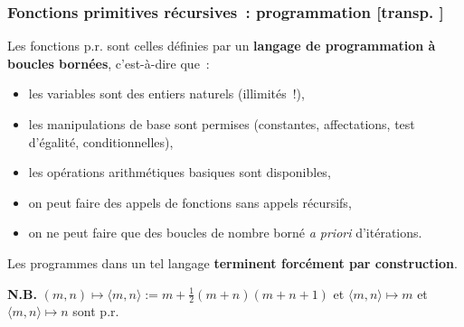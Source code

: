 \documentclass[mathserif,a4paper,aspectratio=169]{beamer}
\newcommand{\itempoint}{\strut\hbox{\color{beamerstructure}\donotcoloroutermaths$\blacktriangleright$}\nobreak\hskip.5em plus.5em\relax}
\newcommand{\donotcoloroutermaths}{\relax}
\renewcommand{\frametitle}[1]{\subsubsection*{#1 {\footnotesize[transp. \insertframenumber]}}}
\newcommand{\myitemmark}{\hbox{$\blacktriangleright$}}
\renewcommand{\itempoint}{\strut\myitemmark\nobreak\hskip.5em plus.5em\relax}
\begin{document}
%
\begin{frame}
\frametitle{Fonctions primitives récursives : programmation}

Les fonctions p.r. sont celles définies par un \textbf{langage de
  programmation à boucles bornées}, c'est-à-dire que :
\begin{itemize}
\item les variables sont des entiers naturels (illimités !),
\item les manipulations de base sont permises (constantes,
  affectations, test d'égalité, conditionnelles),
\item les opérations arithmétiques basiques sont disponibles,
\item on peut faire des appels de fonctions \alert{sans appels récursifs},
\item on ne peut faire que des boucles \alert{de nombre borné
  \textit{a priori}} d'itérations.
\end{itemize}

\medskip

Les programmes dans un tel langage \textbf{terminent forcément par
  construction}.

\bigskip

\textbf{N.B.} $(m,n) \mapsto \langle m,n\rangle := m +
\frac{1}{2}(m+n)(m+n+1)$ et $\langle m,n\rangle \mapsto m$ et $\langle
m,n\rangle \mapsto n$ sont p.r.

\end{frame}
\end{document}
